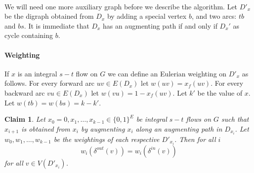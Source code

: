 \documentclass[letterpaper,12pt,oneside,onecolumn]{article}
\newtheorem{claim}[fact]{Claim}
\begin{document}
	\paragraph{}
	We will need one more auxiliary graph before we describe the algorithm. Let $D'_x$ be the digraph obtained from $D_x$ by adding a special vertex $b$, and two arcs: $tb$ and $bs$. It is immediate that $D_x$ has an augmenting path if and only if $D_x'$ as cycle containing $b$.
	\paragraph{Weighting}
	If $x$ is an integral $s-t$ flow on $G$ we can define an Eulerian weighting on $D'_x$ as follows. For every forward arc $uv \in E(D_x)$ let $w(uv) = x_f(uv)$. For every backward arc $vu \in E(D_x)$ let $w(vu) = 1- x_f(uv)$. Let $k'$ be the value of $x$. Let $w(tb) = w(bs) = k-k'$.
	\begin{claim}
		Let $x_0=0,x_1, \dots, x_{k-1}\in \{0,1\}^E$ be integral $s-t$ flows on $G$ such that $x_{i+1}$ is obtained from $x_i$ by augmenting $x_i$ along an augmenting path in $D_{x_i}$. Let $w_0,w_1,\dots, w_{k-1}$ be the weightings of each respective $D'_{x_i}$. Then for all $i$
		$$w_i(\delta^{out}(v)) = w_i(\delta^{in}(v))$$ for all $v \in V(D'_{x_i})$.
	\end{claim}
\end{document}
